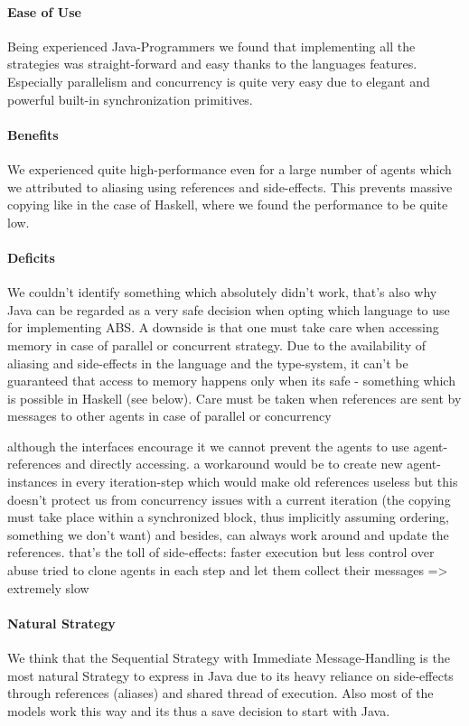 \paragraph{Ease of Use}
Being experienced Java-Programmers we found that implementing all the strategies was straight-forward and easy thanks to the languages features. Especially parallelism and concurrency is quite very easy due to elegant and powerful built-in synchronization primitives.

\paragraph{Benefits}
We experienced quite high-performance even for a large number of agents which we attributed to aliasing using references and side-effects. This prevents massive copying like in the case of Haskell, where we found the performance to be quite low.

\paragraph{Deficits}
We couldn't identify something which absolutely didn't work, that's also why Java can be regarded as a very safe decision when opting which language to use for implementing ABS.
A downside is that one must take care when accessing memory in case of parallel or concurrent strategy. Due to the availability of aliasing and side-effects in the language and the type-system, it can't be guaranteed that access to memory happens only when its safe - something which is possible in Haskell (see below).
Care must be taken when references are sent by messages to other agents in case of parallel or concurrency

although the interfaces encourage it we cannot prevent the agents to use agent-references and directly accessing. a workaround would be to create new agent-instances in every iteration-step which would make old references useless but this doesn't protect us from concurrency issues with a current iteration (the copying must take place within a synchronized block, thus implicitly assuming ordering, something we don't want) and besides, can always work around and update the references.
that's the toll of side-effects: faster execution but less control over abuse
tried to clone agents in each step and let them collect their messages => extremely slow

\paragraph{Natural Strategy}
We think that the Sequential Strategy with Immediate Message-Handling is the most natural Strategy to express in Java due to its heavy reliance on side-effects through references (aliases) and shared thread of execution. Also most of the models work this way and its thus a save decision to start with Java.





